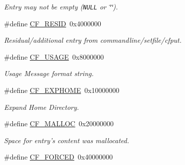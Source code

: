 \begin{CompactItemize}
\begin{CompactList}\small\item\em Entry may not be empty ({\tt NULL} or \char`\"{}\char`\"{}). \item\end{CompactList}\item 
\hypertarget{group__special__options__mask_g5415b257c706aae33d91d3947a3429c0}{
\#define \hyperlink{group__special__options__mask_g5415b257c706aae33d91d3947a3429c0}{CF\_\-RESID}~0x4000000}
\label{group__special__options__mask_g5415b257c706aae33d91d3947a3429c0}

\begin{CompactList}\small\item\em Residual/additional entry from commandline/setfile/cfput. \item\end{CompactList}\item 
\hypertarget{group__special__options__mask_gc30981201d7455071cef38a0133b9228}{
\#define \hyperlink{group__special__options__mask_gc30981201d7455071cef38a0133b9228}{CF\_\-USAGE}~0x8000000}
\label{group__special__options__mask_gc30981201d7455071cef38a0133b9228}

\begin{CompactList}\small\item\em Usage Message format string. \item\end{CompactList}\item 
\hypertarget{group__special__options__mask_gff1b2e25aa9a89a55c1784018e24aa75}{
\#define \hyperlink{group__special__options__mask_gff1b2e25aa9a89a55c1784018e24aa75}{CF\_\-EXPHOME}~0x10000000}
\label{group__special__options__mask_gff1b2e25aa9a89a55c1784018e24aa75}

\begin{CompactList}\small\item\em Expand Home Directory. \item\end{CompactList}\item 
\hypertarget{group__special__options__mask_g2b971231bd3cbad743ef2f4e0a613a47}{
\#define \hyperlink{group__special__options__mask_g2b971231bd3cbad743ef2f4e0a613a47}{CF\_\-MALLOC}~0x20000000}
\label{group__special__options__mask_g2b971231bd3cbad743ef2f4e0a613a47}

\begin{CompactList}\small\item\em Space for entry's content was mallocated. \item\end{CompactList}\item 
\hypertarget{group__special__options__mask_g618e7187ee15bacfe668e72a858e71fc}{
\#define \hyperlink{group__special__options__mask_g618e7187ee15bacfe668e72a858e71fc}{CF\_\-FORCED}~0x40000000}
\label{group__special__options__mask_g618e7187ee15bacfe668e72a858e71fc}


\end{CompactItemize}
